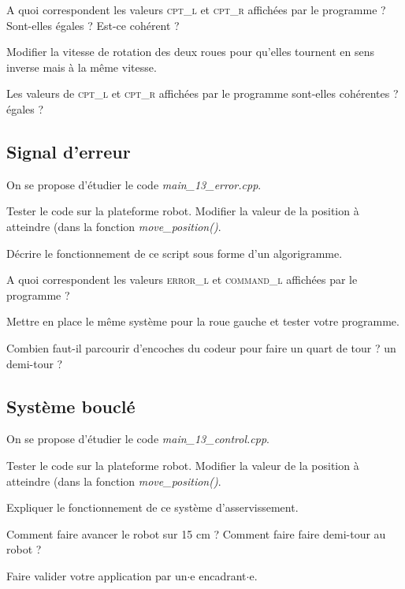 \documentclass[a4paper,12pt,titlepage]{article} %
\begin{document}
\Quest A quoi correspondent les valeurs \textsc{cpt\_l} et \textsc{cpt\_r} affichées par le programme ? Sont-elles égales ? Est-ce cohérent ?

\Manip Modifier la vitesse de rotation des deux roues pour qu'elles tournent en sens inverse mais à la même vitesse.

\Quest Les valeurs de \textsc{cpt\_l} et \textsc{cpt\_r} affichées par le programme sont-elles cohérentes ? égales ?

\subsection{Signal d'erreur}

On se propose d'étudier le code \textsl{main\_13\_error.cpp}.

\Manip Tester le code sur la plateforme robot. Modifier la valeur de la position à atteindre (dans la fonction \textsl{move\_position()}.

\Quest Décrire le fonctionnement de ce script sous forme d'un algorigramme. 

\Quest A quoi correspondent les valeurs \textsc{error\_l} et \textsc{command\_l} affichées par le programme ? 

\medskip

\Manip Mettre en place le même système pour la roue gauche et tester votre programme.

\Quest Combien faut-il parcourir d'encoches du codeur pour faire un quart de tour ? un demi-tour ?

\subsection{Système bouclé}

On se propose d'étudier le code \textsl{main\_13\_control.cpp}.

\Manip Tester le code sur la plateforme robot. Modifier la valeur de la position à atteindre (dans la fonction \textsl{move\_position()}.

\Quest Expliquer le fonctionnement de ce système d'asservissement.

\Quest Comment faire avancer le robot sur 15 cm ? Comment faire faire demi-tour au robot ?


\begin{mdframed}[style=sidebar,frametitle={}]
\large
Faire valider votre application par un$\cdot$e encadrant$\cdot$e.
\end{mdframed}
\end{document}
